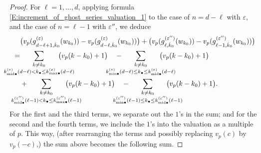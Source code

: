 \begin{proof}
    \label{P:proof_of_ghost_compatible_with_AL}
    For $\ell = 1, \dots, d$, applying formula \eqref{E:increment_of_ghost_series_valuation_1} to the case of $n=d-\ell$ with $\varepsilon$, and the case of $n=\ell-1$ with $\varepsilon''$, we deduce
    \begin{align}
    \label{E:ghost_compatible_with_AL_first_step}
    &\big(v_p(g_{d-\ell+1, \hat k_0}^{(\varepsilon)}(w_{k_0})) - v_p(g_{d-\ell, \hat k_0}^{(\varepsilon)}(w_{k_0}))\big) + \big(v_p(g_{\ell, \hat k_0}^{(\varepsilon'')}(w_{k_0})) - v_p(g_{\ell-1, \hat k_0}^{(\varepsilon'')}(w_{k_0}))\big) \\
    \nonumber =& \hspace{-25pt} \sum_{\substack{k\neq k_0 \\ k^{(\varepsilon)}_{{\mathrm{mid}}\bullet}(d-\ell) < k_\bullet \leq k^{(\varepsilon)}_{{\max}\bullet}(d-\ell)}} \hspace{-25pt}\big( v_p(k-k_0)+1 \big)\quad -  \hspace{-25pt} \sum_{\substack{k\neq k_0 \\ k^{(\varepsilon)}_{{\min}\bullet}(d-\ell) \leq  k_\bullet \leq k^{(\varepsilon)}_{{{\mathrm{mid}}}\bullet}(d-\ell)}} \hspace{-25pt}\big( v_p(k-k_0)+1 \big)\\
    \nonumber &+ \hspace{-25pt} \sum_{\substack{k\neq k_0 \\ k^{(\varepsilon'')}_{{\mathrm{mid}}\bullet}(\ell-1) < k_\bullet \leq k^{(\varepsilon'')}_{{\max}\bullet}(\ell-1)}} \hspace{-25pt}\big( v_p(k-k_0)+1 \big)\quad -  \hspace{-25pt} \sum_{\substack{k\neq k_0 \\ k^{(\varepsilon'')}_{{\min}\bullet}(\ell-1) \leq k_\bullet \leq k^{(\varepsilon'')}_{{{\mathrm{mid}}}\bullet}(\ell-1)}} \hspace{-25pt}\big( v_p(k-k_0)+1 \big).
    \end{align}
    For the first and the third terms, we separate out the $1$'s in the sum; and for the second and the fourth terms, we include the $1$'s into the valuation as a multiple of $p$.
    This way, (after rearranging the terms and possibly replacing $v_p(c)$ by $v_p(-c)$,) the sum above becomes the following sum.

\end{proof}

